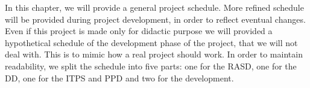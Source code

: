 In this chapter, we will provide a general project schedule. More refined schedule will be provided during project development, in order to reflect eventual changes. Even if this project is made only for didactic purpose we will provided a hypothetical schedule of the development phase of the project, that we will not deal with.  This is to mimic how a real project should work.
In order to maintain readability, we split the schedule into five parts: one for the RASD, one for the DD, one for the ITPS and PPD and two for the development.

\begin{center}
\end{center}

\begin{center}
\end{center}

\begin{center}
\end{center}

\begin{center}
\end{center}

\begin{center}
\end{center}